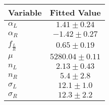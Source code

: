 \begin{tabular}[t]{lc}
\hline
Variable &Fitted Value\\
\hline\hline
$\alpha_L$&$1.41\pm0.24$\\
\hline
$\alpha_R$&$-1.42\pm0.27$\\
\hline
$f_{\frac{L}{R}}$&$0.65\pm0.19$\\
\hline
$\mu$&$5280.04\pm0.11$\\
\hline
$n_L$&$2.13\pm0.43$\\
\hline
$n_R$&$5.4\pm2.8$\\
\hline
$\sigma_L$&$12.1\pm1.0$\\
\hline
$\sigma_R$&$12.3\pm2.2$\\
\hline
\end{tabular}